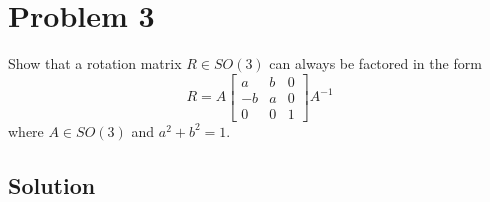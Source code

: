 \section*{Problem 3}

Show that a rotation matrix \( R \in S O(3) \) can always be factored in the form
\[
    R=A\left[\begin{array}{ccc}
            a  & b & 0 \\
            -b & a & 0 \\
            0  & 0 & 1
        \end{array}\right] A^{-1}
\]
where \( A \in S O(3) \) and \( a^{2}+b^{2}=1 \).

\subsection*{Solution}
